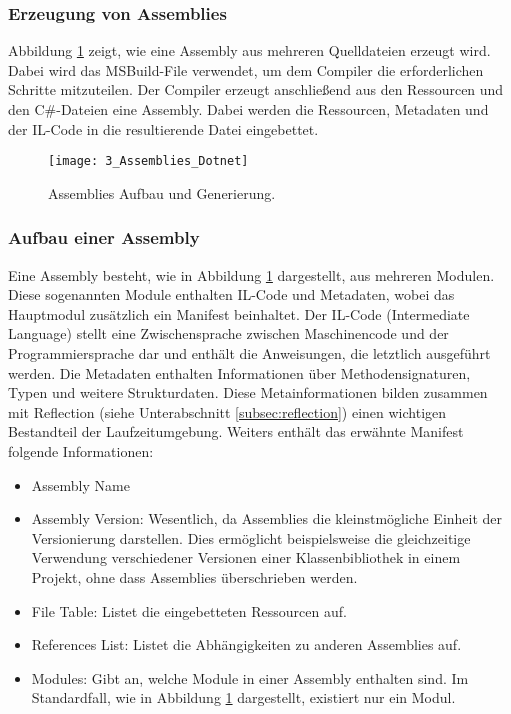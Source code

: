 \subsubsection{Erzeugung von Assemblies}
Abbildung \ref{fig:assemblies_dotnet} zeigt, wie eine Assembly aus mehreren Quelldateien erzeugt wird. Dabei wird das MSBuild-File verwendet, um dem Compiler die erforderlichen Schritte mitzuteilen. Der Compiler erzeugt anschließend aus den Ressourcen und den C\#-Dateien eine Assembly. Dabei werden die Ressourcen, Metadaten und der IL-Code in die resultierende Datei eingebettet.

\begin{figure}[H]
    \centering
    \texttt{[image: 3\_Assemblies\_Dotnet]}
    \caption{Assemblies Aufbau und Generierung.}
    \label{fig:assemblies_dotnet}
\end{figure}

\subsubsection{Aufbau einer Assembly}
Eine Assembly besteht, wie in Abbildung \ref{fig:assemblies_dotnet} dargestellt, aus mehreren Modulen. Diese sogenannten Module enthalten IL-Code und Metadaten, wobei das Hauptmodul zusätzlich ein Manifest beinhaltet.  
Der IL-Code (Intermediate Language) stellt eine Zwischensprache zwischen Maschinencode und der Programmiersprache dar und enthält die Anweisungen, die letztlich ausgeführt werden.  
Die Metadaten enthalten Informationen über Methodensignaturen, Typen und weitere Strukturdaten. Diese Metainformationen bilden zusammen mit Reflection (siehe Unterabschnitt \ref{subsec:reflection}) einen wichtigen Bestandteil der Laufzeitumgebung. Weiters enthält das erwähnte Manifest folgende Informationen:

\begin{itemize}
    \item Assembly Name
    \item Assembly Version: Wesentlich, da Assemblies die kleinstmögliche Einheit der Versionierung darstellen. Dies ermöglicht beispielsweise die gleichzeitige Verwendung verschiedener Versionen einer Klassenbibliothek in einem Projekt, ohne dass Assemblies überschrieben werden.
    \item File Table: Listet die eingebetteten Ressourcen auf.
    \item References List: Listet die Abhängigkeiten zu anderen Assemblies auf.
    \item Modules: Gibt an, welche Module in einer Assembly enthalten sind. Im Standardfall, wie in Abbildung \ref{fig:assemblies_dotnet} dargestellt, existiert nur ein Modul.
\end{itemize}

